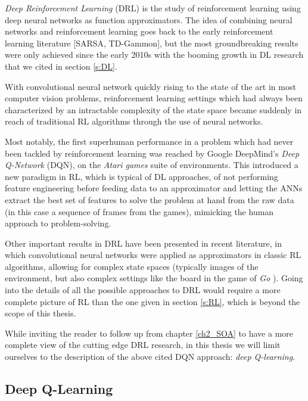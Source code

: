 \textit{Deep Reinforcement Learning} (DRL) is the study of reinforcement 
learning using deep neural networks as function approximators. 
The idea of combining neural networks and reinforcement learning goes back to 
the early reinforcement learning literature [SARSA, TD-Gammon], but the most
groundbreaking results were only achieved since the early 2010s with the booming
growth in DL research that we cited in section \ref{s:DL}.

With convolutional neural network quickly rising to the state of the art in 
most computer vision problems, reinforcement learning settings which had always 
been characterized by an intractable complexity of the state space became 
suddenly in reach of traditional RL algorithms through the use of neural 
networks.

Most notably, the first superhuman performance in a problem which had never 
been tackled by reinforcement learning was reached by Google DeepMind's 
\textit{Deep Q-Network} (DQN), on the \textit{Atari games} suite of environments. 
This introduced a new paradigm in RL, which is typical of DL 
approaches, of not performing feature engineering before feeding data to an 
approximator and letting the ANNs extract the best set of features to solve the 
problem at hand from the raw data (in this case a sequence of frames from the 
games), mimicking the human approach to problem-solving. 

Other important results in DRL have been presented in recent literature, in 
which convolutional neural networks were applied as approximators in classic
RL algorithms, allowing for complex state spaces (typically images of the 
environment, but also complex settings like the board in the game of \textit{Go}
). Going into the details of all the possible approaches to DRL would require a 
more complete picture of RL than the one given in section \ref{s:RL}, which is
beyond the scope of this thesis. 

While inviting the reader to follow up from chapter \ref{ch2_SOA} to have a more
complete view of the cutting edge DRL research, in this thesis we will limit
ourselves to the description of the above cited DQN approach: \textit{deep
Q-learning}.

\subsection{Deep Q-Learning}





